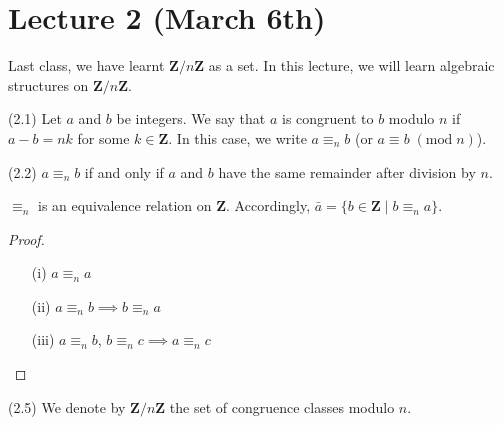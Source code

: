 \section{Lecture 2 (March 6th)}
Last class, we have learnt ${\bm Z}/n{\bm Z}$ as a set. In this lecture, we will learn algebraic structures on ${\bm Z}/n{\bm Z}$.
\\
\begin{defi}
(2.1) Let $a$ and $b$ be integers. We say that $a$ is congruent to $b$ modulo $n$ if $a-b=nk$ for some $k\in {\bm Z}$. In this case, we write $a \equiv_{n} b $ (or $a\equiv b\;(\mathrm{mod}\;n)$).
\end{defi}
\vspace{2ex}
\begin{rmk}
	(2.2) $a\equiv_{n} b$ if and only if $a$ and $b$ have the same remainder after division by $n$.
\end{rmk}
\vspace{2ex}
\begin{rmk}
$\equiv_{n}$ is an equivalence relation on ${\bm Z}$. Accordingly, $\bar{a}=\{b\in {\bm Z} \;|\; b\equiv_{n}a\}$.
\end{rmk}
\begin{proof}
\begin{itemize}
	\item[(i)] $a\equiv_{n}a$
	\item[(ii)] $a\equiv_{n}b\implies b \equiv_{n}a$
	\item[(iii)] $a \equiv_{n} b$, $b \equiv_{n} c\implies a \equiv_{n} c$
\end{itemize}
\end{proof}
\vspace{2ex}
\begin{defi}
(2.5) We denote by ${\bm Z}/n{\bm Z}$ the set of congruence classes modulo $n$.
\end{defi}
\vspace{2ex}

